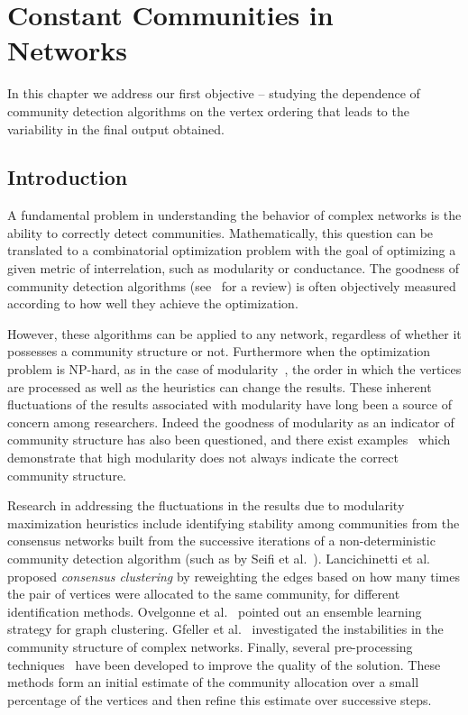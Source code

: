 \clearpage

\thispagestyle{empty}

\chapter[Constant Communities in Networks]{Constant Communities in Networks} In this chapter we
address our first objective -- studying the dependence of community detection algorithms on the vertex ordering that leads to the
variability in the final output obtained.

\section{Introduction}

A fundamental problem in understanding the behavior of complex networks is the ability to correctly detect
communities. Mathematically, this
question can be translated to a combinatorial
optimization problem with the goal of optimizing a given metric of interrelation, such as modularity or
conductance. The goodness of community detection algorithms (see~\cite{lf2009} for a review) is often
objectively measured according to how well they achieve the optimization.

However, these algorithms can be applied to any network, regardless of whether it possesses a community
structure or not. Furthermore when the optimization problem is NP-hard, as in the case of
modularity~\cite{ng2002}, the order in which the vertices are processed as well as the heuristics can change
the results. These inherent fluctuations of the results associated with modularity have long been a source of concern
among researchers. Indeed the goodness of modularity as an indicator of community structure has also been
questioned, and there exist examples~\cite{gmc2010} which demonstrate that high modularity does not always
indicate the correct community structure. 

Research in addressing the fluctuations in the results due to modularity maximization heuristics include identifying
stability among communities from the consensus networks built from the successive iterations of a non-deterministic
community detection algorithm (such as by Seifi et al.~\cite{sjri2012}). Lancichinetti et al.~\cite{lf2012}
proposed {\em consensus clustering} by reweighting the edges based on how many times the pair of vertices were
allocated to the same community, for different identification methods.  Ovelgonne et
al.~\cite{ogy2012} pointed out an ensemble learning strategy for graph clustering. Gfeller et al.~\cite{gcr2012}
investigated the instabilities in the community structure of complex networks. Finally, several pre-processing
techniques~\cite{PhysRevE.72., reidy} have been developed to improve the quality of the solution. These methods form
an initial estimate of the community allocation over a small percentage of the vertices and then refine this
estimate over successive steps.



